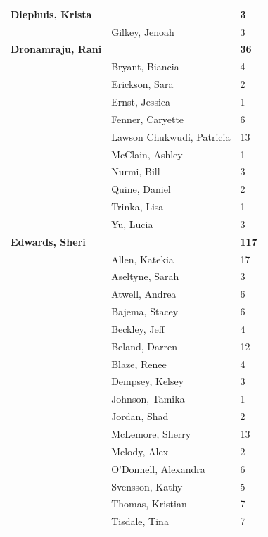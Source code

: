 \documentclass{article}\usepackage[]{graphicx}\usepackage[]{color}
\begin{document}
{\begin{longtable} { >{\raggedright}p{}|p{}p{}}
   \rowcolor[gray]{0.90}\textbf{Diephuis, Krista} &  & \hspace{2cm}\textbf{3} \\ 
   \rowcolor[gray]{0.90} & Gilkey, Jenoah & 3 \\ 
   \rowcolor[gray]{0.90}\textbf{Dronamraju, Rani} &  & \hspace{2cm}\textbf{36} \\ 
   & Bryant, Biancia & 4 \\ 
   & Erickson, Sara & 2 \\ 
   & Ernst, Jessica & 1 \\ 
   \rowcolor[gray]{0.90} & Fenner, Caryette & 6 \\ 
   \rowcolor[gray]{0.90} & Lawson Chukwudi, Patricia & 13 \\ 
   \rowcolor[gray]{0.90} & McClain, Ashley & 1 \\ 
   & Nurmi, Bill & 3 \\ 
   & Quine, Daniel & 2 \\ 
   & Trinka, Lisa & 1 \\ 
   \rowcolor[gray]{0.90} & Yu, Lucia & 3 \\ 
   \rowcolor[gray]{0.90}\textbf{Edwards, Sheri} &  & \hspace{2cm}\textbf{117} \\ 
   \rowcolor[gray]{0.90} & Allen, Katekia & 17 \\ 
   & Aseltyne, Sarah & 3 \\ 
   & Atwell, Andrea & 6 \\ 
   & Bajema, Stacey & 6 \\ 
   \rowcolor[gray]{0.90} & Beckley, Jeff & 4 \\ 
   \rowcolor[gray]{0.90} & Beland, Darren & 12 \\ 
   \rowcolor[gray]{0.90} & Blaze, Renee & 4 \\ 
   & Dempsey, Kelsey & 3 \\ 
   & Johnson, Tamika & 1 \\ 
   & Jordan, Shad & 2 \\ 
   \rowcolor[gray]{0.90} & McLemore, Sherry & 13 \\ 
   \rowcolor[gray]{0.90} & Melody, Alex & 2 \\ 
   \rowcolor[gray]{0.90} & O'Donnell, Alexandra & 6 \\ 
   & Svensson, Kathy & 5 \\ 
   & Thomas, Kristian & 7 \\ 
   & Tisdale, Tina & 7 \\ 

\end{longtable}}
\end{document}
